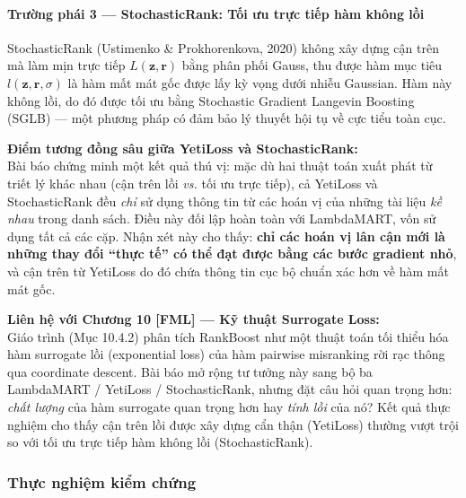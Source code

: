 \paragraph{Trường phái 3 --- StochasticRank: Tối ưu trực tiếp hàm không lồi}
StochasticRank (Ustimenko \& Prokhorenkova, 2020) không xây dựng cận trên mà làm mịn trực tiếp $L(\mathbf{z}, \mathbf{r})$ bằng phân phối Gauss, thu được hàm mục tiêu $l(\mathbf{z}, \mathbf{r}, \sigma)$ là hàm mất mát gốc được lấy kỳ vọng dưới nhiễu Gaussian. Hàm này không lồi, do đó được tối ưu bằng Stochastic Gradient Langevin Boosting (SGLB) --- một phương pháp có đảm bảo lý thuyết hội tụ về cực tiểu toàn cục.

\begin{nhan_xet_box}
  \textbf{Điểm tương đồng sâu giữa YetiLoss và StochasticRank:} \\
  Bài báo chứng minh một kết quả thú vị: mặc dù hai thuật toán xuất phát từ triết lý khác nhau (cận trên lồi \emph{vs.} tối ưu trực tiếp), cả YetiLoss và StochasticRank đều \emph{chỉ} sử dụng thông tin từ các hoán vị của những tài liệu \emph{kề nhau} trong danh sách. Điều này đối lập hoàn toàn với LambdaMART, vốn sử dụng tất cả các cặp. Nhận xét này cho thấy: \textbf{chỉ các hoán vị lân cận mới là những thay đổi ``thực tế'' có thể đạt được bằng các bước gradient nhỏ}, và cận trên từ YetiLoss do đó chứa thông tin cục bộ chuẩn xác hơn về hàm mất mát gốc.
\end{nhan_xet_box}

\begin{lienhe_ly_thuyet}
  \textbf{Liên hệ với Chương 10 [FML] --- Kỹ thuật Surrogate Loss:} \\
  Giáo trình (Mục 10.4.2) phân tích RankBoost như một thuật toán tối thiểu hóa hàm surrogate lồi (exponential loss) của hàm pairwise misranking rời rạc thông qua coordinate descent. Bài báo mở rộng tư tưởng này sang bộ ba LambdaMART / YetiLoss / StochasticRank, nhưng đặt câu hỏi quan trọng hơn: \emph{chất lượng} của hàm surrogate quan trọng hơn hay \emph{tính lồi} của nó? Kết quả thực nghiệm cho thấy cận trên lồi được xây dựng cẩn thận (YetiLoss) thường vượt trội so với tối ưu trực tiếp hàm không lồi (StochasticRank).
\end{lienhe_ly_thuyet}

\subsubsection{Thực nghiệm kiểm chứng}

